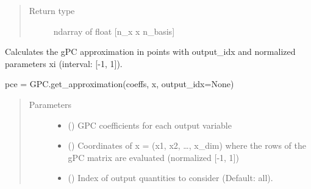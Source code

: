 \documentclass[letterpaper,10pt,english,openany,oneside]{sphinxmanual}
\begin{document}
\begin{fulllineitems}
\begin{fulllineitems}
\begin{quote}
\begin{description}
\item[{Return type}] \leavevmode
ndarray of float {[}n\_x x n\_basis{]}

\end{description}\end{quote}

\end{fulllineitems}


\begin{fulllineitems}
\label{\detokenize{pygpc:pygpc.GPC.GPC.get_approximation}}
Calculates the gPC approximation in points with output\_idx and normalized parameters xi (interval: {[}-1, 1{]}).

pce = GPC.get\_approximation(coeffs, x, output\_idx=None)
\begin{quote}\begin{description}
\item[{Parameters}] \leavevmode\begin{itemize}
\item {} 
 (\sphinxstyleliteralemphasis{\sphinxupquote{ {[}}}\sphinxstyleliteralemphasis{\sphinxupquote{{]}}}) \textendash{} GPC coefficients for each output variable

\item {} 
 (\sphinxstyleliteralemphasis{\sphinxupquote{ {[}}}\sphinxstyleliteralemphasis{\sphinxupquote{{]}}}) \textendash{} Coordinates of x = (x1, x2, …, x\_dim) where the rows of the gPC matrix are evaluated (normalized {[}-1, 1{]})

\item {} 
 (\sphinxstyleliteralemphasis{\sphinxupquote{, }}\sphinxstyleliteralemphasis{\sphinxupquote{, }}\sphinxstyleliteralemphasis{\sphinxupquote{ {[}}}\sphinxstyleliteralemphasis{\sphinxupquote{{]}}}) \textendash{} Index of output quantities to consider (Default: all).


\end{itemize}
\end{description}
\end{quote}
\end{fulllineitems}
\end{fulllineitems}
\end{document}
